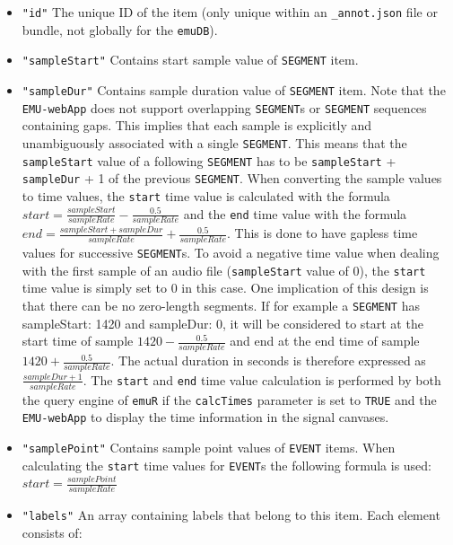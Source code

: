 \documentclass[]{book}
\begin{document}
\begin{itemize}
\begin{itemize}
    \begin{itemize}
    \item
      \texttt{"id"} The unique ID of the item (only unique within an
      \texttt{\_annot.json} file or bundle, not globally for the \texttt{emuDB}).
    \item
      \texttt{"sampleStart"} Contains start sample value of \texttt{SEGMENT}
      item.
    \item
      \texttt{"sampleDur"} Contains sample duration value of \texttt{SEGMENT}
      item. Note that the \texttt{EMU-webApp} does not support
      overlapping \texttt{SEGMENT}s or \texttt{SEGMENT} sequences containing
      gaps. This implies that each sample is explicitly and
      unambiguously associated with a single \texttt{SEGMENT}. This means
      that the \texttt{sampleStart} value of a following \texttt{SEGMENT} has to
      be \texttt{sampleStart} + \texttt{sampleDur} + 1 of the previous
      \texttt{SEGMENT}. When converting the sample values to time values,
      the \texttt{start} time value is calculated with the formula
      \(start = \frac{sampleStart}{sampleRate} - \frac{0.5}{sampleRate}\)
      and the \texttt{end} time value with the formula
      \(end = \frac{sampleStart + sampleDur}{sampleRate} + \frac{0.5}{ sampleRate}\).
      This is done to have gapless time values for successive
      \texttt{SEGMENT}s. To avoid a negative time value when dealing with
      the first sample of an audio file (\texttt{sampleStart} value of
      \(0\)), the \texttt{start} time value is simply set to \(0\) in this
      case. One implication of this design is that there can be no zero-length
      segments. If for example a \texttt{SEGMENT} has sampleStart: 1420 and
      sampleDur: 0, it will be considered to start at the
      start time of sample \(1420 - \frac{0.5}{sampleRate}\) and end at
      the end time of sample \(1420 + \frac{0.5}{sampleRate}\). The actual
      duration in seconds is therefore expressed as \(\frac{sampleDur + 1}{sampleRate}\).
      The \texttt{start} and \texttt{end} time value calculation is
      performed by both the query engine of \texttt{emuR} if the
      \texttt{calcTimes} parameter is set to \texttt{TRUE} and the \texttt{EMU-webApp}
      to display the time information in the signal canvases.
    \item
      \texttt{"samplePoint"} Contains sample point values of \texttt{EVENT}
      items. When calculating the \texttt{start} time values for \texttt{EVENT}s
      the following formula is used:
      \(start = \frac{samplePoint}{sampleRate}\)
    \item
      \texttt{"labels"} An array containing labels that belong to this
      item. Each element consists of:


\end{itemize}
\end{itemize}
\end{itemize}
\end{document}
